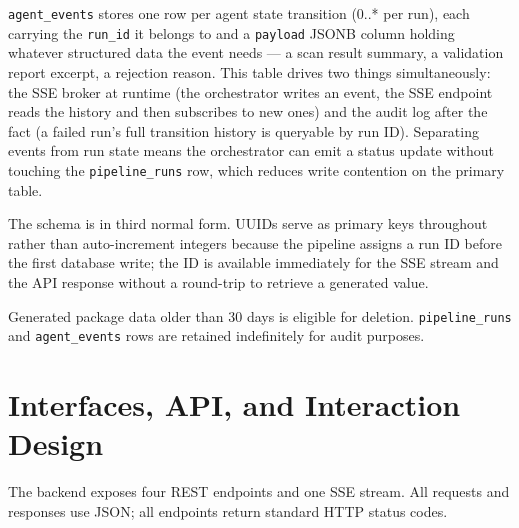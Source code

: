 \texttt{agent\_events} stores one row per agent state transition (0..* per
run), each carrying the \texttt{run\_id} it belongs to and a
\texttt{payload} JSONB column holding whatever structured data the event
needs --- a scan result summary, a validation report excerpt, a rejection
reason. This table drives two things simultaneously: the SSE broker at
runtime (the orchestrator writes an event, the SSE endpoint reads the
history and then subscribes to new ones) and the audit log after the fact
(a failed run's full transition history is queryable by run ID).
Separating events from run state means the orchestrator can emit a status
update without touching the \texttt{pipeline\_runs} row, which reduces
write contention on the primary table.

The schema is in third normal form. UUIDs serve as primary keys throughout
rather than auto-increment integers because the pipeline assigns a run ID
before the first database write; the ID is available immediately for the SSE
stream and the API response without a round-trip to retrieve a generated
value.

Generated package data older than 30 days is eligible for deletion.
\texttt{pipeline\_runs} and \texttt{agent\_events} rows are retained
indefinitely for audit purposes.

\section{Interfaces, API, and Interaction Design}
\label{sec:api-design}
\label{sec:sequence-design}
\label{sec:concurrency-design}

The backend exposes four REST endpoints and one SSE stream. All requests and
responses use JSON; all endpoints return standard HTTP status codes.

